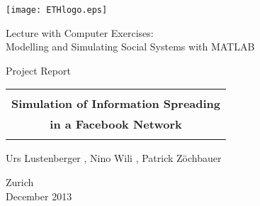 
\thispagestyle{empty}

\begin{center}
\texttt{[image: ETHlogo.eps]}

\bigskip


\bigskip


\bigskip


\LARGE{ 	Lecture with Computer Exercises:\\ }
\LARGE{ Modelling and Simulating Social Systems with MATLAB\\}

\bigskip

\bigskip

\small{Project Report}\\

\bigskip

\bigskip

\bigskip

\bigskip


\begin{tabular}{|c|}
\hline
\\
\textbf{\LARGE{Simulation of Information Spreading}}\\
\textbf{\LARGE{in a Facebook Network}}\\
\\
\hline
\end{tabular}
\bigskip

\bigskip

\bigskip

\LARGE{Urs Lustenberger , Nino Wili , Patrick Z\"ochbauer}



\bigskip

\bigskip

\bigskip

\bigskip

\bigskip

\bigskip

\bigskip

\bigskip

Zurich\\
December 2013\\

\end{center}


